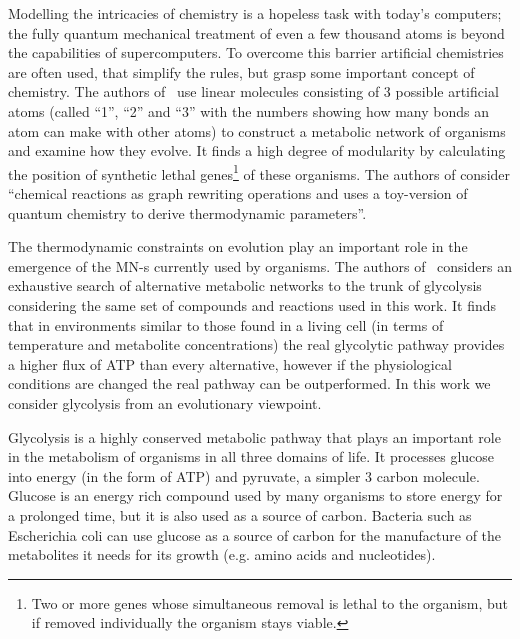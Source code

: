 \documentclass[a4paper,12pt]{article}
\begin{document}
	Modelling the intricacies of chemistry is a hopeless task with today's computers; the fully quantum mechanical treatment of even a few thousand atoms is beyond the capabilities of supercomputers. To overcome this barrier artificial chemistries are often used, that simplify the rules, but grasp some important concept of chemistry\cite{artificialreview}. The authors of~\cite{evolutioncomplex} use linear molecules consisting of 3 possible artificial atoms (called ``1'', ``2'' and ``3'' with the numbers showing how many bonds an atom can make with other atoms) to construct a metabolic network of organisms and examine how they evolve. It finds a high degree of modularity by calculating the position of synthetic lethal genes\footnote{Two or more genes whose simultaneous removal is lethal to the organism, but if removed individually the organism stays viable.} of these organisms. The authors of \cite{computationalframework} consider ``chemical reactions as graph rewriting operations and uses a toy-version of quantum chemistry to derive thermodynamic parameters''. %
	
	The thermodynamic constraints on evolution play an important role in the emergence of the MN-s currently used by organisms. The authors of~\cite{BartekLower} considers an exhaustive search of alternative metabolic networks to the trunk of glycolysis considering the same set of compounds and reactions used in this work. It finds that in environments similar to those found in a living cell (in terms of temperature and metabolite concentrations) the real glycolytic pathway provides a higher flux of ATP than every alternative, however if the physiological conditions are changed the real pathway can be outperformed. In this work we consider glycolysis from an evolutionary viewpoint. 


	

Glycolysis is a highly conserved metabolic pathway that plays an important role in the metabolism of organisms in all three domains of life. It processes glucose into energy (in the form of ATP) and pyruvate, a simpler 3 carbon molecule. Glucose is an energy rich compound used by many organisms to store energy for a prolonged time, but it is also used as a source of carbon. Bacteria such as Escherichia coli can use glucose as a source of carbon for the manufacture of the metabolites it needs for its growth (e.g. amino acids and nucleotides)\cite[]{principlesofbio}.
\end{document}
